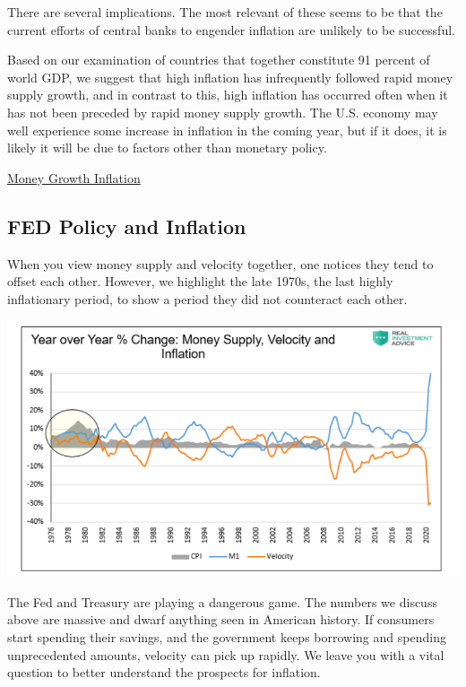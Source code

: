 \documentclass[
]{book}
\begin{document}
There are several implications. The most relevant of these seems to be that the current efforts of central banks to engender inflation are unlikely to be successful.

Based on our examination of countries that together constitute 91 percent of world GDP, we suggest that high inflation has infrequently followed rapid money supply growth, and in contrast to this, high inflation has occurred often when it has not been preceded by rapid money supply growth. The U.S. economy may well experience some increase in inflation in the coming year, but if it does, it is likely it will be due to factors other than monetary policy.

\href{https://evonomics.com/moneysupply/}{Money Growth Inflation}

\hypertarget{fed-policy-and-inflation}{%
\subsection{FED Policy and Inflation}\label{fed-policy-and-inflation}}

When you view money supply and velocity together, one notices they tend to offset each other. However, we highlight the late 1970s, the last highly inflationary period, to show a period they did not counteract each other.

\includegraphics{fig/money_and_inflation_US.png}

The Fed and Treasury are playing a dangerous game. The numbers we discuss above are massive and dwarf anything seen in American history. If consumers start spending their savings, and the government keeps borrowing and spending unprecedented amounts, velocity can pick up rapidly. We leave you with a vital question to better understand the prospects for inflation.
\end{document}
